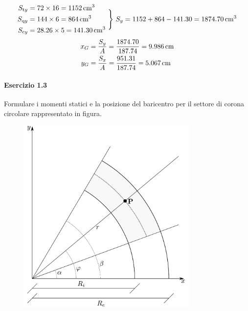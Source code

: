\begin{equation*}
\begin{aligned}
S_{\textup{t}y} &= 72\times 16 = 1152\,\textup{cm}^3 \\
S_{\textup{q}y} &= 144\times 6 = 864\,\textup{cm}^3 \\
S_{\textup{c}y} &= 28.26\times 5  = 141.30\,\textup{cm}^3
\end{aligned}
\,\,\Biggr\}\,\, S_y = 1152+864-141.30 = 1874.70\,\textup{cm}^3
\end{equation*}
\begin{align*} 
x_G    &= \frac{S_y}{A} = \frac{1874.70}{187.74} = 9.986\,\textup{cm}  \\
y_G    &= \frac{S_x}{A} = \frac{951.31}{187.74} = 5.067\,\textup{cm}
\end{align*}
\paragraph{Esercizio 1.3}
Formulare i momenti statici e la posizione del baricentro per il settore di corona circolare rappresentato in figura.
\renewcommand{\thefigure}{1.3~-~1}
\begin{figure}[ht]
\centering
\includegraphics[width=0.8\textwidth]{Immagini/Parte_1/Esercizio1_3/Esercizio1_3.pdf}
\caption{}
\label{Esercizio1_3}
\end{figure}

